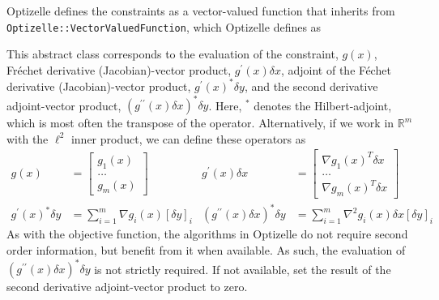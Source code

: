 \documentclass{report}
\newcommand{\re}{\mathbb{R}}
\begin{document}
        Optizelle defines the constraints as a vector-valued function that inherits from \texttt{Optizelle::VectorValuedFunction}, which Optizelle defines as

This abstract class corresponds to the evaluation of the constraint, $g(x)$, Fr\'{e}chet derivative (Jacobian)-vector product, $g^\prime(x)\delta x$, adjoint of the F\'{e}chet derivative (Jacobian)-vector product, $g^\prime(x)^*\delta y$, and the second derivative adjoint-vector product, $(g^{\prime\prime}(x)\delta x)^*\delta y$.  Here, $^*$ denotes the Hilbert-adjoint, which is most often the transpose of the operator.  Alternatively, if we work in $\re^m$ with the $\ell^2$ inner product, we can define these operators as
\begin{align*}
        g(x)&=\begin{bmatrix}
            g_1(x)\\
            \dots\\
            g_m(x)
        \end{bmatrix}
        & g^\prime(x)\delta x&=\begin{bmatrix}
                \nabla g_1(x)^T \delta x\\
                \dots\\
                \nabla g_m(x)^T \delta x
        \end{bmatrix}\\
        g^\prime(x)^*\delta y&=
        \sum\limits_{i=1}^m \nabla g_i(x) [\delta y]_i 
        & (g^{\prime\prime}(x)\delta x)^*\delta y&=
        \sum\limits_{i=1}^m \nabla^2 g_i(x)\delta x [\delta y]_i 
\end{align*}
As with the objective function, the algorithms in Optizelle do not require second order information, but benefit from it when available.  As such, the evaluation of $(g^{\prime\prime}(x)\delta x)^*\delta y$ is not strictly required.  If not available, set the result of the second derivative adjoint-vector product to zero.
\end{document}

